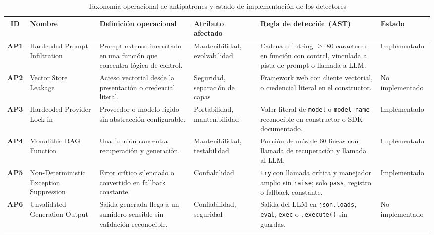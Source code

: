 \begin{table}[t]
\centering
\scriptsize
\setlength{\tabcolsep}{3.5pt}
\caption{Taxonomía operacional de antipatrones y estado de implementación de los detectores}
\label{tab:taxonomia}
\begin{tabularx}{\textwidth}{@{}c >{\raggedright\arraybackslash}p{2.6cm} >{\raggedright\arraybackslash}X >{\raggedright\arraybackslash}p{2.2cm} >{\raggedright\arraybackslash}X l@{}}
\toprule
\textbf{ID} & \textbf{Nombre} & \textbf{Definición operacional} & \textbf{Atributo afectado} & \textbf{Regla de detección (AST)} & \textbf{Estado} \\
\midrule
\textbf{AP1} & Hardcoded Prompt Infiltration & Prompt extenso incrustado en una función que concentra lógica de control. & Mantenibilidad, evolvabilidad & Cadena o f-string $\geq$ 80 caracteres en función con control, vinculada a pista de prompt o llamada a LLM. & Implementado \\
\textbf{AP2} & Vector Store Leakage & Acceso vectorial desde la presentación o credencial literal. & Seguridad, separación de capas & Framework web con cliente vectorial, o credencial literal en el constructor. & No implementado \\
\textbf{AP3} & Hardcoded Provider Lock-in & Proveedor o modelo rígido sin abstracción configurable. & Portabilidad, mantenibilidad & Valor literal de \texttt{model} o \texttt{model\_name} reconocible en constructor o SDK documentado. & Implementado \\
\textbf{AP4} & Monolithic RAG Function & Una función concentra recuperación y generación. & Mantenibilidad, testabilidad & Función de más de 60 líneas con llamada de recuperación y llamada al LLM. & Implementado \\
\textbf{AP5} & Non-Deterministic Exception Suppression & Error crítico silenciado o convertido en fallback constante. & Confiabilidad & \texttt{try} con llamada crítica y manejador amplio sin \texttt{raise}; solo \texttt{pass}, registro o fallback constante. & Implementado \\
\textbf{AP6} & Unvalidated Generation Output & Salida generada llega a un sumidero sensible sin validación reconocible. & Confiabilidad, seguridad & Salida del LLM en \texttt{json.loads}, \texttt{eval}, \texttt{exec} o \texttt{.execute()} sin guardas. & No implementado \\
\bottomrule
\end{tabularx}
\end{table}